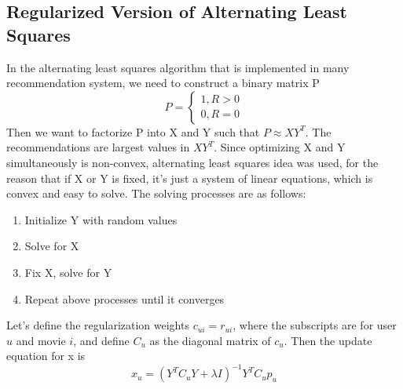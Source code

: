 \documentclass{article}
\begin{document}
\subsection{Regularized Version of Alternating Least Squares}
In the alternating least squares algorithm that is implemented in many recommendation system, we need to construct a binary matrix P
\begin{equation*}
P = \begin{cases}
				1, R > 0\\
				0, R = 0
		\end{cases}
\end{equation*}
Then we want to factorize P into X and Y such that $P \approx XY^T$. The recommendations are largest values in $XY^T$. Since optimizing X and Y simultaneously is non-convex, alternating least squares idea was used, for the reason that if X or Y is fixed, it's just a system of linear equations, which is convex and easy to solve. The solving processes are as follows:
\begin{enumerate}
\item Initialize Y with random values
\item Solve for X
\item Fix X, solve for Y
\item Repeat above processes until it converges
\end{enumerate}
Let's define the regularization weights $c_{ui} = r_{ui}$, where the subscripts are for user $u$ and movie $i$, and define $C_u$ as the diagonal matrix of $c_u$. Then the update equation for x is
\begin{equation*}
x_u = (Y^TC_uY+\lambda I)^{-1}Y^TC_up_u
\end{equation*}
\end{document}
